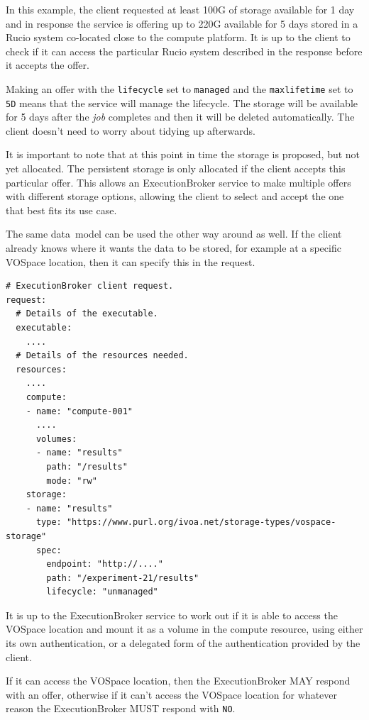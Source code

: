 \documentclass[11pt,a4paper]{ivoa}
\newcommand{\datamodel} {data~model}
\newcommand{\vospace} {VOSpace}
\newcommand{\execbrokerclass} {ExecutionBroker}
\newcommand{\rucio} {Rucio}
\newcommand{\codeword}[1] {\texttt{#1}}
\newcommand{\job} {\textit{job}}
\begin{document}
In this example, the client requested at least 100G of storage available for 1 day
and in response the service is offering up to 220G available for 5 days stored in a
\rucio{} system co-located close to the compute platform.
It is up to the client to check if it can access the particular \rucio{} system
described in the response before it accepts the offer.

Making an offer with the \codeword{lifecycle} set to \codeword{managed} and the
\codeword{maxlifetime} set to \codeword{5D}
means that the service will manage the lifecycle.
The storage will be available for 5 days after the \job{} completes and then it
will be deleted automatically.
The client doesn't need to worry about tidying up afterwards.

It is important to note that at this point in time the storage is proposed, but not yet allocated.
The persistent storage is only allocated if the client accepts this particular offer.
This allows an \execbrokerclass{} service to make multiple offers with different storage options,
allowing the client to select and accept the one that best fits its use case.

The same \datamodel{} can be used the other way around as well.
If the client already knows where it wants the data to be stored, for example at a specific
\vospace{} location, then it can specify this in the request.

\begin{lstlisting}[]
# ExecutionBroker client request.
request:
  # Details of the executable.
  executable:
    ....
  # Details of the resources needed.
  resources:
    ....
    compute:
    - name: "compute-001"
      ....
      volumes:
      - name: "results"
        path: "/results"
        mode: "rw"
    storage:
    - name: "results"
      type: "https://www.purl.org/ivoa.net/storage-types/vospace-storage"
      spec:
        endpoint: "http://...."
        path: "/experiment-21/results"
        lifecycle: "unmanaged"
\end{lstlisting}

It is up to the \execbrokerclass{} service to work out if it is able to access the
\vospace{} location and mount it as a volume in the compute resource,
using either its own authentication, or a delegated form of the authentication
provided by the client.

If it can access the \vospace{} location, then the \execbrokerclass{} MAY respond
with an offer, otherwise if it can't access the \vospace{} location for whatever
reason the \execbrokerclass{} MUST respond with \codeword{NO}.
\end{document}
